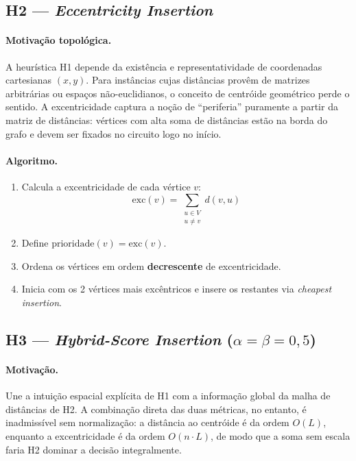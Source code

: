 \documentclass[12pt, a4paper]{article}
\begin{document}
\subsection{H2 --- \textit{Eccentricity Insertion}}

\paragraph{Motivação topológica.}
A heurística H1 depende da existência e representatividade de coordenadas cartesianas
$(x, y)$. Para instâncias cujas distâncias provêm de matrizes arbitrárias ou espaços
não-euclidianos, o conceito de centróide geométrico perde o sentido. A excentricidade
captura a noção de ``periferia'' puramente a partir da matriz de distâncias: vértices com
alta soma de distâncias estão na borda do grafo e devem ser fixados no circuito logo no
início.

\paragraph{Algoritmo.}
\begin{enumerate}
    \item Calcula a excentricidade de cada vértice $v$:
          \begin{equation}
              \mathrm{exc}(v) = \sum_{\substack{u \in V \\ u \neq v}} d(v, u)
          \end{equation}
    \item Define $\mathrm{prioridade}(v) = \mathrm{exc}(v)$.
    \item Ordena os vértices em ordem \textbf{decrescente} de excentricidade.
    \item Inicia com os 2 vértices mais excêntricos e insere os restantes via
          \textit{cheapest insertion}.
\end{enumerate}

\subsection{H3 --- \textit{Hybrid-Score Insertion} ($\alpha = \beta = 0{,}5$)}

\paragraph{Motivação.}
Une a intuição espacial explícita de H1 com a informação global da malha de distâncias
de H2. A combinação direta das duas métricas, no entanto, é inadmissível sem
normalização: a distância ao centróide é da ordem $O(L)$, enquanto a excentricidade é
da ordem $O(n \cdot L)$, de modo que a soma sem escala faria H2 dominar a decisão
integralmente.
\end{document}
